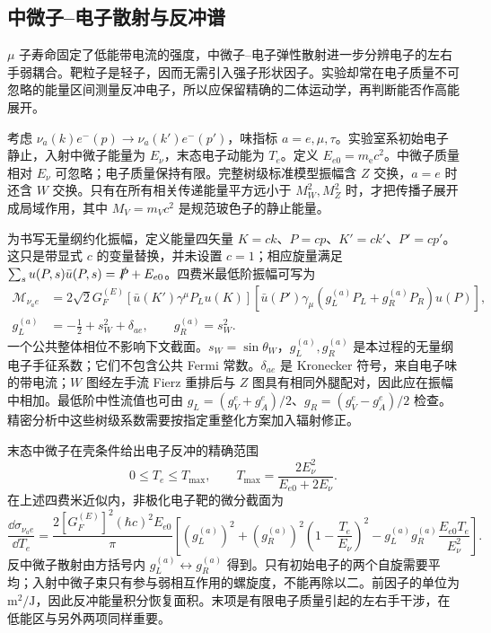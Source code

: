 \subsection{中微子--电子散射与反冲谱}
\label{sec:sm-neutrino-electron-applications}

$\mu$ 子寿命固定了低能带电流的强度，中微子--电子弹性散射进一步分辨电子的左右手弱耦合。靶粒子是轻子，因而无需引入强子形状因子。实验却常在电子质量不可忽略的能量区间测量反冲电子，所以应保留精确的二体运动学，再判断能否作高能展开。

考虑 $\nu_a(k)e^-(p)\to\nu_a(k')e^-(p')$，味指标 $a=e,\mu,\tau$。实验室系初始电子静止，入射中微子能量为 $E_\nu$，末态电子动能为 $T_e$。定义 $E_{e0}=m_{\mathrm e} c^2$。中微子质量相对 $E_\nu$ 可忽略；电子质量保持有限。完整树级标准模型振幅含 $Z$ 交换，$a=e$ 时还含 $W$ 交换。只有在所有相关传递能量平方远小于 $M_W^2,M_Z^2$ 时，才把传播子展开成局域作用，其中 $M_V=m_Vc^2$ 是规范玻色子的静止能量。

为书写无量纲约化振幅，定义能量四矢量 $K=ck$、$P=cp$、$K'=ck'$、$P'=cp'$。这只是带显式 $c$ 的变量替换，并未设置 $c=1$；相应旋量满足 $\sum_s u(P,s)\bar u(P,s)=\slashed P+E_{e0}$。四费米最低阶振幅可写为
\begin{equation}
 \begin{aligned}
 \mathcal M_{\nu_a e}
 &=2\sqrt2G_F^{(E)}
 [\bar u(K')\gamma^\mu P_Lu(K)]
 [\bar u(P')\gamma_\mu(g_L^{(a)}P_L+g_R^{(a)}P_R)u(P)],\\
 g_L^{(a)}&=-\frac12+s_W^2+\delta_{ae},\qquad
 g_R^{(a)}=s_W^2.
 \end{aligned}
 \label{eq:sm-nue-fermi-amplitude}
\end{equation}
一个公共整体相位不影响下文截面。$s_W=\sin\theta_W$，$g_L^{(a)},g_R^{(a)}$ 是本过程的无量纲电子手征系数；它们不包含公共 Fermi 常数。$\delta_{ae}$ 是 Kronecker 符号，来自电子味的带电流；$W$ 图经左手流 Fierz 重排后与 $Z$ 图具有相同外腿配对，因此应在振幅中相加。最低阶中性流值也可由 $g_L=(g_V^e+g_A^e)/2$、$g_R=(g_V^e-g_A^e)/2$ 检查。精密分析中这些树级系数需要按指定重整化方案加入辐射修正\cite{ErlerFreitas2024EW}。

末态中微子在壳条件给出电子反冲的精确范围
\begin{equation}
 0\leq T_e\leq T_{\max},\qquad
 T_{\max}=\frac{2E_\nu^2}{E_{e0}+2E_\nu}.
 \label{eq:sm-nue-recoil-endpoint}
\end{equation}
在上述四费米近似内，非极化电子靶的微分截面为
\begin{equation}
 \frac{\dd\sigma_{\nu_a e}}{\dd T_e}
 =\frac{2[G_F^{(E)}]^2(\hbar c)^2E_{e0}}{\pi}
 \left[(g_L^{(a)})^2+(g_R^{(a)})^2\left(1-\frac{T_e}{E_\nu}\right)^2
 -g_L^{(a)}g_R^{(a)}\frac{E_{e0}T_e}{E_\nu^2}\right].
 \label{eq:sm-nue-recoil-spectrum}
\end{equation}
反中微子散射由方括号内 $g_L^{(a)}\leftrightarrow g_R^{(a)}$ 得到。只有初始电子的两个自旋需要平均；入射中微子束只有参与弱相互作用的螺旋度，不能再除以二。前因子的单位为 $\mathrm{m^2/J}$，因此反冲能量积分恢复面积。末项是有限电子质量引起的左右手干涉，在低能区与另外两项同样重要。

